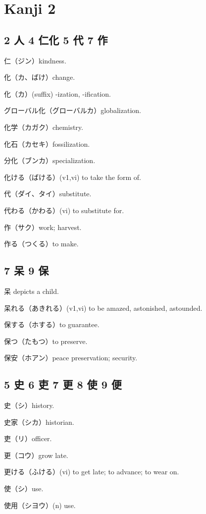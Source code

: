 \chapter{Kanji 2}

\section{2 人 4 仁化 5 代 7 作}

仁（ジン）kindness.

化（カ、ばけ）change.

化（カ）(suffix) -ization, -ification.

グローバル化（グローバルカ）globalization.

化学（カガク）chemistry.

化石（カセキ）fossilization.

分化（ブンカ）specialization.

化ける（ばける）(v1,vi) to take the form of.

代（ダイ、タイ）substitute.

代わる（かわる）(vi) to substitute for.

作（サク）work; harvest.

作る（つくる）to make.

\section{7 呆 9 保}

呆 depicts a child.

呆れる（あきれる）(v1,vi) to be amazed, astonished, astounded.

保する（ホする）to guarantee.

保つ（たもつ）to preserve.

保安（ホアン）peace preservation; security.

\section{5 史 6 吏 7 更 8 使 9 便}

史（シ）history.

史家（シカ）historian.

吏（リ）officer.

更（コウ）grow late.

更ける（ふける）(vi) to get late; to advance; to wear on.

使（シ）use.

使用（シヨウ）(n) use.

